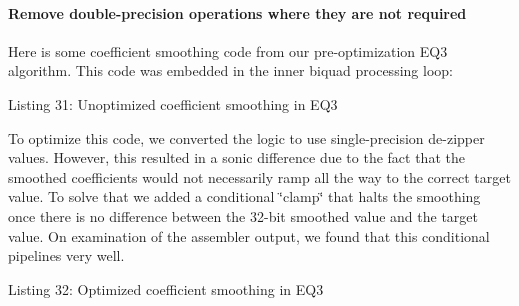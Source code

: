 \hypertarget{a00832_subsubsection__remove_doubleprecision_operations_where_they_are_not_required_}{}\paragraph{Remove double-\/precision operations where they are not required}\label{a00832_subsubsection__remove_doubleprecision_operations_where_they_are_not_required_}
 Here is some coefficient smoothing code from our pre-\/optimization E\+Q3 algorithm. This code was embedded in the inner biquad processing loop\+:


\begin{DoxyCode}{0}
\DoxyCodeLine{\textcolor{preprocessor}{\# pragma UNROLL ( CBiquad::eNumCoefs )}}
\DoxyCodeLine{\{}
\DoxyCodeLine{\}}
\DoxyCodeLine{ }
\DoxyCodeLine{\textcolor{preprocessor}{\# pragma UNROLL ( CBiquad::eNumCoefs )}}
\DoxyCodeLine{\{}
\DoxyCodeLine{\} }
\end{DoxyCode}
  Listing 31\+: Unoptimized coefficient smoothing in E\+Q3

To optimize this code, we converted the logic to use single-\/precision de-\/zipper values. However, this resulted in a sonic difference due to the fact that the smoothed coefficients would not necessarily ramp all the way to the correct target value. To solve that we added a conditional \char`\"{}clamp\char`\"{} that halts the smoothing once there is no difference between the 32-\/bit smoothed value and the target value. On examination of the assembler output, we found that this conditional pipelines very well.


\begin{DoxyCode}{0}
\DoxyCodeLine{\textcolor{preprocessor}{\# pragma UNROLL ( CBiquad::eNumCoefs )}}
\DoxyCodeLine{\{}
\DoxyCodeLine{\} }
\end{DoxyCode}
  Listing 32\+: Optimized coefficient smoothing in E\+Q3

